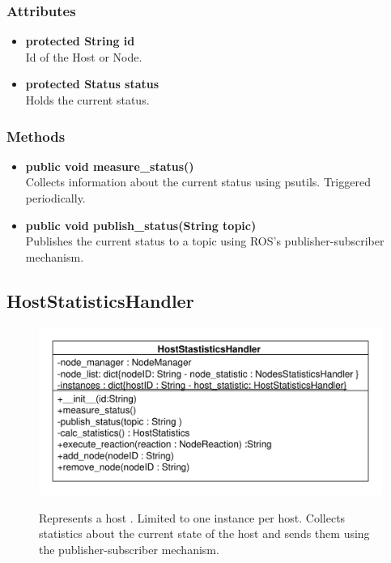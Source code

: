 \subsubsection{Attributes}
\begin{itemize}
	\item \textbf{protected String id}\\
	Id of the Host or Node.	
	\item \textbf{protected Status status}\\
	Holds the current status.
\end{itemize}

\subsubsection{Methods}
\begin{itemize}
\item \textbf{public void measure\_status()}\\
			Collects information about the current status using psutils.
			Triggered periodically.
\item \textbf{public void publish\_status(String topic)}\\
			Publishes the current status to a topic using ROS's publisher-subscriber mechanism.
\end{itemize}



\subsection{HostStatisticsHandler}
\begin{figure}[htbp]
	\begin{minipage}[t]{7cm}
		\vspace{0pt}
		\centering
		\includegraphics[scale=0.6]{./diagram_pictures/NodeInterface/HostStatisticsHandler.pdf}
	\end{minipage}
	\hfill
	\begin{minipage}[t]{5cm}
		\vspace{10pt}
		Represents a host . Limited to one instance per host. Collects statistics about the current state of the host and sends them using the 				publisher-subscriber mechanism.
	\end{minipage}
\end{figure}


